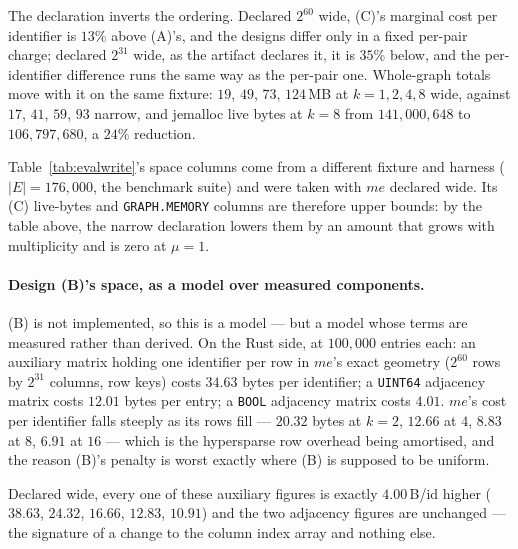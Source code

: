 \documentclass[11pt,a4paper]{article}
\theoremstyle{plain}
\theoremstyle{definition}
\theoremstyle{remark}
\begin{document}
The declaration inverts the ordering. Declared $2^{60}$ wide, (C)'s marginal
cost per identifier is $13\%$ above (A)'s, and the designs differ only in a
fixed per-pair charge; declared $2^{31}$ wide, as the artifact declares it, it
is $35\%$ below, and the per-identifier difference runs the same way as the
per-pair one. Whole-graph totals move with it on the same fixture: $19$, $49$,
$73$, $124$\,MB at $k = 1, 2, 4, 8$ wide, against $17$, $41$, $59$, $93$ narrow,
and jemalloc live bytes at $k = 8$ from $141{,}000{,}648$ to $106{,}797{,}680$,
a $24\%$ reduction.

Table~\ref{tab:evalwrite}'s space columns come from a different fixture and
harness ($|E| = 176{,}000$, the benchmark suite) and were taken with $me$
declared wide. Its (C) live-bytes and \texttt{GRAPH.MEMORY} columns are
therefore upper bounds: by the table above, the narrow declaration lowers them
by an amount that grows with multiplicity and is zero at $\mu = 1$.

\paragraph{Design (B)'s space, as a model over measured components.} (B) is
not implemented, so this is a model --- but a model whose terms are
measured rather than derived. On the Rust side, at $100{,}000$ entries each: an
auxiliary matrix holding one identifier per row in $me$'s exact geometry
($2^{60}$ rows by $2^{31}$ columns, row keys) costs $34.63$ bytes per
identifier; a \texttt{UINT64} adjacency matrix costs $12.01$ bytes per entry;
a \texttt{BOOL} adjacency matrix costs $4.01$. $me$'s cost per identifier falls
steeply as its rows fill --- $20.32$ bytes at $k = 2$, $12.66$ at $4$, $8.83$
at $8$, $6.91$ at $16$ --- which is the hypersparse row overhead being
amortised, and the reason (B)'s penalty is worst exactly where (B) is supposed
to be uniform.

Declared wide, every one of these auxiliary figures is exactly $4.00$\,B/id
higher ($38.63$, $24.32$, $16.66$, $12.83$, $10.91$) and the two adjacency
figures are unchanged --- the signature of a change to the column index array
and nothing else.
\end{document}
